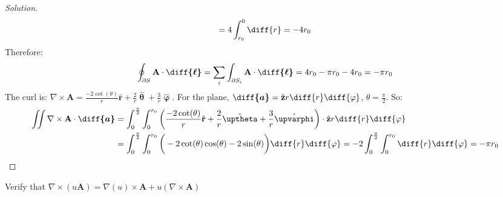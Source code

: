 \documentclass[crop=false,class=book,oneside]{standalone}
\begin{document}
\begin{proof}[Solution]
\begin{equation*}
                    =4\int_{r_{0}}^{0}\diff{r}
                    =-4r_{0}
                \end{equation*}
                Therefore:
                \begin{equation*}
                    \oint_{\partial S}
                    \mathbf{A}\cdot\boldsymbol{\diff{\ell}}
                    =\sum_{i}\int_{\partial S_{i}}
                    \mathbf{A}\cdot\boldsymbol{\diff{\ell}}
                    =4r_{0}-\pi{r}_{0}-4r_{0}
                    =-\pi r_{0}
                \end{equation*}
                The curl is:
                $\nabla\times\mathbf{A}%
                 =\frac{-2\cot(\theta)}{r}\hat{\mathbf{r}}%
                 +\frac{2}{r}\hat{\boldsymbol{\uptheta}}%
                 +\frac{3}{r}\hat{\boldsymbol{\upvarphi}}$.
                For the plane,
                $\boldsymbol{\diff{a}}%
                 =\hat{\mathbf{z}}r\diff{r}\diff{\varphi}$,
                $\theta=\frac{\pi}{2}$. So:
                \begin{align*}
                    \iint\nabla\times
                    \mathbf{A}\cdot\boldsymbol{\diff{a}}
                    &=\int_{0}^{\frac{\pi}{2}}\int_{0}^{r_{0}}
                    \bigg(
                        \frac{-2\cot(\theta)}{r}\hat{\mathbf{r}}
                        +\frac{2}{r}\hat{\boldsymbol{\uptheta}}
                        +\frac{3}{r}\hat{\boldsymbol{\upvarphi}}
                    \bigg)
                    \cdot\hat{\mathbf{z}}r\diff{r}\diff{\varphi}\\
                    &=\int_{0}^{\frac{\pi}{2}}\int_{0}^{r_{0}}
                    \bigg(
                        -2\cot(\theta)\cos(\theta)
                        -2\sin(\theta)
                    \bigg)\diff{r}\diff{\varphi}
                    =-2\int_{0}^{\frac{\pi}{2}}
                    \int_{0}^{r_{0}}\diff{r}\diff{\varphi}
                    =-\pi r_{0}
                \end{align*}
            \end{proof}
            \begin{problem}[Wangsness 1-24]
                Verify that
                $\nabla\times(u\mathbf{A})%
                 =\nabla(u)\times\mathbf{A}%
                 +u(\nabla\times\mathbf{A})$
            \end{problem}
\end{document}
